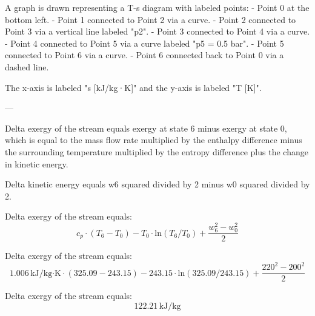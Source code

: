 A graph is drawn representing a T-s diagram with labeled points:  
- Point 0 at the bottom left.  
- Point 1 connected to Point 2 via a curve.  
- Point 2 connected to Point 3 via a vertical line labeled "p2".  
- Point 3 connected to Point 4 via a curve.  
- Point 4 connected to Point 5 via a curve labeled "p5 = 0.5 bar".  
- Point 5 connected to Point 6 via a curve.  
- Point 6 connected back to Point 0 via a dashed line.  

The x-axis is labeled "s [kJ/kg·K]" and the y-axis is labeled "T [K]".

---

Delta exergy of the stream equals exergy at state 6 minus exergy at state 0, which is equal to the mass flow rate multiplied by the enthalpy difference minus the surrounding temperature multiplied by the entropy difference plus the change in kinetic energy.  

Delta kinetic energy equals w6 squared divided by 2 minus w0 squared divided by 2.  

Delta exergy of the stream equals:  
\[ c_p \cdot (T_6 - T_0) - T_0 \cdot \text{ln}(T_6 / T_0) + \frac{w_6^2 - w_0^2}{2} \]  

Delta exergy of the stream equals:  
\[ 1.006 \, \text{kJ/kg·K} \cdot (325.09 - 243.15) - 243.15 \cdot \text{ln}(325.09 / 243.15) + \frac{220^2 - 200^2}{2} \]  

Delta exergy of the stream equals:  
\[ 122.21 \, \text{kJ/kg} \]